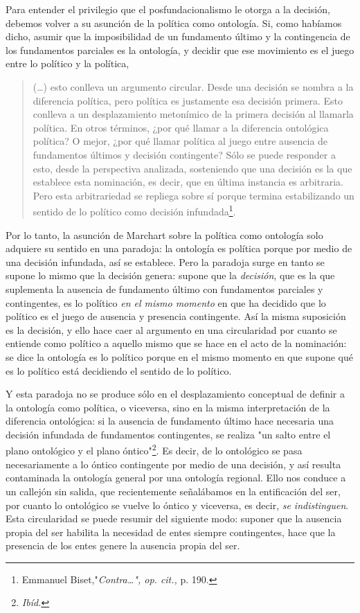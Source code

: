 \documentclass{book}
\begin{document}
Para entender el privilegio que el posfundacionalismo le otorga a la
decisión, debemos volver a su asunción de la política como ontología.
Si, como habíamos dicho, asumir que la imposibilidad de un fundamento
último y la contingencia de los fundamentos parciales es la ontología, y
decidir que ese movimiento es el juego entre lo político y la política,

\begin{quote}
(\dots) esto conlleva un argumento circular. Desde una decisión se
nombra a la diferencia política, pero política es justamente esa
decisión primera. Esto conlleva a un desplazamiento metonímico de la
primera decisión al llamarla política. En otros términos, ¿por qué
llamar a la diferencia ontológica política? O mejor, ¿por qué llamar
política al juego entre ausencia de fundamentos últimos y decisión
contingente? Sólo se puede responder a esto, desde la perspectiva
analizada, sosteniendo que una decisión es la que establece esta
nominación, es decir, que en última instancia es arbitraria. Pero esta
arbitrariedad se repliega sobre sí porque termina estabilizando un
sentido de lo político como decisión infundada\footnote{Emmanuel
  Biset,"\emph{Contra\ldots", op. cit.,} p. 190.}.
\end{quote}

Por lo tanto, la asunción de Marchart sobre la política como ontología
solo adquiere su sentido en una paradoja: la ontología es política
porque por medio de una decisión infundada, así se establece. Pero la
paradoja surge en tanto se supone lo mismo que la decisión genera:
supone que la \emph{decisión}, que es la que suplementa la ausencia de
fundamento último con fundamentos parciales y contingentes, es lo
político \emph{en el mismo momento} en que ha decidido que lo político
es el juego de ausencia y presencia contingente. Así la misma suposición
es la decisión, y ello hace caer al argumento en una circularidad por
cuanto se entiende como político a aquello mismo que se hace en el acto
de la nominación: se dice la ontología es lo político porque en el mismo
momento en que supone qué es lo político está decidiendo el sentido de
lo político.

Y esta paradoja no se produce sólo en el desplazamiento conceptual de
definir a la ontología como política, o viceversa, sino en la misma
interpretación de la diferencia ontológica: si la ausencia de fundamento
último hace necesaria una decisión infundada de fundamentos
contingentes, se realiza "un salto entre el plano ontológico y el plano
óntico"\footnote{\emph{Ibíd.}}. Es decir, de lo ontológico se pasa
necesariamente a lo óntico contingente por medio de una decisión, y así
resulta contaminada la ontología general por una ontología regional.
Ello nos conduce a un callejón sin salida, que recientemente señalábamos
en la entificación del ser, por cuanto lo ontológico se vuelve lo óntico
y viceversa, es decir, \emph{se indistinguen}. Esta circularidad se
puede resumir del siguiente modo: suponer que la ausencia propia del ser
habilita la necesidad de entes siempre contingentes, hace que la
presencia de los entes genere la ausencia propia del ser.
\end{document}
